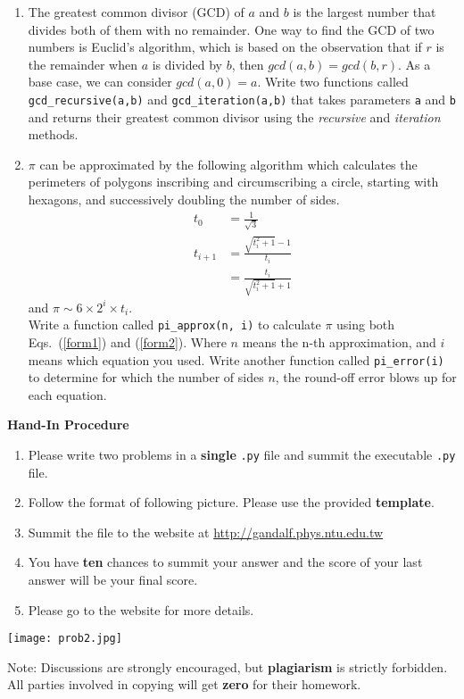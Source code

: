 \documentclass[12pt]{article}
\begin{document}
\begin{enumerate}
\item 
The greatest common divisor (GCD) of $a$ and $b$ is the largest number
that divides both of them with no remainder.
One way to find the GCD of two numbers is Euclid's algorithm,
which is based on the observation that if $r$ is the remainder
when $a$ is divided by $b$, then $gcd(a, b) = gcd(b, r)$.
As a base case, we can consider $gcd(a, 0) = a$.
Write two functions called
\verb"gcd_recursive(a,b)" and \verb"gcd_iteration(a,b)" that takes parameters {\tt a} and {\tt b}
and returns their greatest common divisor using the \textit{recursive} and \textit{iteration} methods.
\item $\pi$ can be approximated by the following algorithm which calculates the perimeters of polygons inscribing and circumscribing a circle, starting with hexagons, and successively doubling the number of sides.
\begin{eqnarray}
t_0&=\frac{1}{\sqrt{3}}\nonumber\\
t_{i+1}&=\frac{\sqrt{t_i^2+1}-1}{t_i}\label{form1}\\
          &=\frac{t_i}{\sqrt{t_i^2+1}+1}\label{form2}
\end{eqnarray}
and $\pi \sim 6 \times 2^i\times t_i$.\\
Write a function called \texttt{pi\_approx(n, i)} to calculate $\pi$ using both Eqs.~(\ref{form1}) and (\ref{form2}). Where $n$ means the n-th approximation, and $i$ means which equation you used. Write another function called \texttt{pi\_error(i)} to determine for which the number of sides $n$, the round-off error blows up for each equation.

\end{enumerate} 

\textbf{Hand-In Procedure}  
 \begin{enumerate}
\item Please write two problems in a \textbf{single} \texttt{.py} file and summit the executable \texttt{.py} file. 
\item Follow the format of following picture.  Please use the provided \textbf{template}.
\item Summit the file to the website at \url{http://gandalf.phys.ntu.edu.tw}
\item You have \textbf{ten} chances to summit your answer and the score of your last answer will
  be your final score.
\item Please go to the website for more details.
\end{enumerate}

\texttt{[image: prob2.jpg]}

Note: Discussions are strongly encouraged, but \textbf{plagiarism} is strictly forbidden. All parties involved in copying will get \textbf{zero} for their homework.
\end{document}

